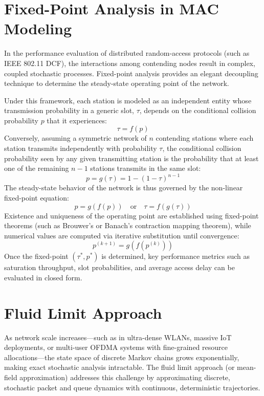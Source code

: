 \section{Fixed-Point Analysis in MAC Modeling}
In the performance evaluation of distributed random-access protocols (such as IEEE 802.11 DCF), the interactions among contending nodes result in complex, coupled stochastic processes. Fixed-point analysis provides an elegant decoupling technique to determine the steady-state operating point of the network.

Under this framework, each station is modeled as an independent entity whose transmission probability in a generic slot, $\tau$, depends on the conditional collision probability $p$ that it experiences:
\begin{equation}
    \tau = f(p)
\end{equation}
Conversely, assuming a symmetric network of $n$ contending stations where each station transmits independently with probability $\tau$, the conditional collision probability seen by any given transmitting station is the probability that at least one of the remaining $n-1$ stations transmits in the same slot:
\begin{equation}
    p = g(\tau) = 1 - (1 - \tau)^{n-1}
\end{equation}
The steady-state behavior of the network is thus governed by the non-linear fixed-point equation:
\begin{equation}
    p = g(f(p)) \quad \text{or} \quad \tau = f(g(\tau))
\end{equation}
Existence and uniqueness of the operating point are established using fixed-point theorems (such as Brouwer's or Banach's contraction mapping theorem), while numerical values are computed via iterative substitution until convergence:
\begin{equation}
    p^{(k+1)} = g(f(p^{(k)}))
\end{equation}
Once the fixed-point $(\tau^*, p^*)$ is determined, key performance metrics such as saturation throughput, slot probabilities, and average access delay can be evaluated in closed form.

\section{Fluid Limit Approach}
As network scale increases---such as in ultra-dense WLANs, massive IoT deployments, or multi-user OFDMA systems with fine-grained resource allocations---the state space of discrete Markov chains grows exponentially, making exact stochastic analysis intractable. The fluid limit approach (or mean-field approximation) addresses this challenge by approximating discrete, stochastic packet and queue dynamics with continuous, deterministic trajectories.

